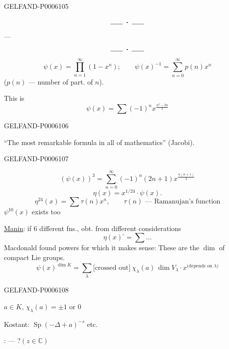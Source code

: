 \begin{GelfandAdjacentEvidence}{GELFAND-P000610}{5}


\[\rule{1.8em}{.4pt}\;\boldsymbol{\cdot}\;\rule{1.8em}{.4pt}\]
 — 
\[\rule{1.8em}{.4pt}\;\boldsymbol{\cdot}\;\rule{1.8em}{.4pt}\]
\[
\psi(x)=\prod_{n=1}^{\infty}(1-x^n);\qquad
\psi(x)^{-1}=\sum_{n=0}^{\infty}p(n)x^n
\]
(\(p(n)\) — number of part. of \(n\)).

This is
\[
\psi(x)=\sum(-1)^n x^{\frac{n^2-3n}{2}}
\]
\end{GelfandAdjacentEvidence}
\begin{GelfandAdjacentEvidence}{GELFAND-P000610}{6}


\noindent\makebox[0pt][r]{\(\bullet\)\hspace{.7em}}“The most remarkable formula in all of mathematics” (Jacobi).
\end{GelfandAdjacentEvidence}
\begin{GelfandAdjacentEvidence}{GELFAND-P000610}{7}

\[
(\psi(x))^3=\sum_{n=0}^{\infty}(-1)^n(2n+1)x^{\frac{n(n+1)}2}
\]
\[
\eta(x)=x^{1/24}\cdot\psi(x).
\]
\[
\eta^{24}(x)=\sum\tau(n)x^n,\qquad\tau(n)\text{ — Ramanujan’s function}
\]
\(\psi^{10}(x)\) exists too

\underline{Manin}: if 6 different fns., obt. from different considerations
\[
\eta(x)^{\square}=\sum\ldots
\]
Macdonald found powers for which it makes sense:
These are the \(\dim\) of compact Lie groups.
\[
\psi(x)^{\dim K}=\sum_\lambda\text{[crossed out]}\ \chi_\lambda(a)\,\dim V_\lambda\cdot x^{\text{(depends on }\lambda\text{)}}
\]
\end{GelfandAdjacentEvidence}
\begin{GelfandAdjacentEvidence}{GELFAND-P000610}{8}

\(a\in K\), \(\chi_\lambda(a)=\pm1\) or \(0\)

Kostant: \(\operatorname{Sp}(-\Delta+a)^{-s}\) etc.

:  — ?\qquad \((z\in\mathbb C)\)
\end{GelfandAdjacentEvidence}
